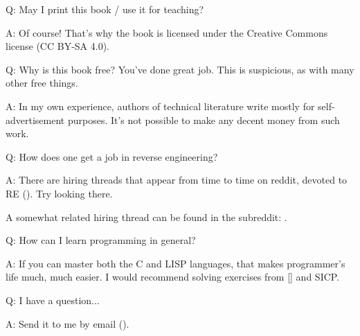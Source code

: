\par Q: May I print this book / use it for teaching?
\par A: Of course! That's why the book is licensed under the Creative Commons license (CC BY-SA 4.0).

\par Q: Why is this book free? You've done great job. This is suspicious, as with many other free things.
\par A: In my own experience, authors of technical literature write mostly for self-advertisement purposes. It's not possible to make any decent money from such work.

\par Q: How does one get a job in reverse engineering?
\par A: There are hiring threads that appear from time to time on reddit, devoted to RE\FNURLREDDIT{}
(\RedditHiringThread{}).
Try looking there.

A somewhat related hiring thread can be found in the  subreddit: \NetsecHiringThread{}.

\par Q: How can I learn programming in general?
\par A: If you can master both the C and LISP languages, that makes programmer's life much, much easier.
I would recommend solving exercises from [\KRBook] and \ac{SICP}.

\par Q: I have a question...
\par A: Send it to me by email (\EMAIL).
